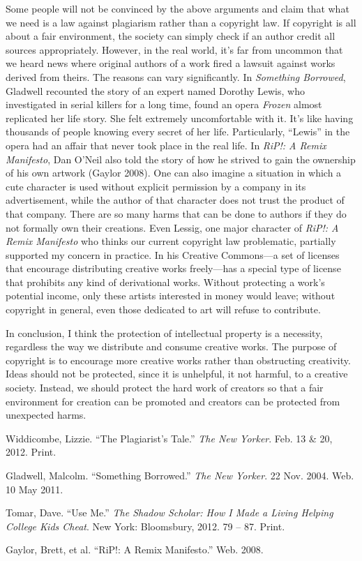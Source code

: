 \documentclass{writing}
\begin{document}
Some people will not be convinced by the above arguments and claim that
what we need is a law against plagiarism rather than a copyright law. If
copyright is all about a fair environment, the society can simply check
if an author credit all sources appropriately. However, in the real
world, it's far from uncommon that we heard news where original authors
of a work fired a lawsuit against works derived from theirs. The reasons
can vary significantly. In \emph{Something Borrowed}, Gladwell recounted
the story of an expert named Dorothy Lewis, who investigated in serial
killers for a long time, found an opera \emph{Frozen} almost replicated
her life story. She felt extremely uncomfortable with it. It's like
having thousands of people knowing every secret of her life.
Particularly, ``Lewis'' in the opera had an affair that never took place
in the real life. In \emph{RiP!: A Remix Manifesto}, Dan O'Neil also
told the story of how he strived to gain the ownership of his own
artwork (Gaylor 2008). One can also imagine a situation in which a cute
character is used without explicit permission by a company in its
advertisement, while the author of that character does not trust the
product of that company. There are so many harms that can be done to
authors if they do not formally own their creations. Even Lessig, one
major character of \emph{RiP!: A Remix Manifesto} who thinks our current
copyright law problematic, partially supported my concern in practice.
In his Creative Commons---a set of licenses that encourage distributing
creative works freely---has a special type of license that prohibits any
kind of derivational works. Without protecting a work's potential
income, only these artists interested in money would leave; without
copyright in general, even those dedicated to art will refuse to
contribute.

In conclusion, I think the protection of intellectual property is a
necessity, regardless the way we distribute and consume creative works.
The purpose of copyright is to encourage more creative works rather than
obstructing creativity. Ideas should not be protected, since it is
unhelpful, it not harmful, to a creative society. Instead, we should
protect the hard work of creators so that a fair environment for
creation can be promoted and creators can be protected from unexpected
harms.

\begin{references}
\item
  Widdicombe, Lizzie. ``The Plagiarist's Tale.'' \emph{The New Yorker}.
  Feb. 13 \& 20, 2012. Print.
\item
  Gladwell, Malcolm. ``Something Borrowed.'' \emph{The New Yorker}. 22
  Nov. 2004. Web. 10 May 2011.
\item
  Tomar, Dave. ``Use Me.'' \emph{The Shadow Scholar: How I Made a Living
  Helping College Kids Cheat}. New York: Bloomsbury, 2012. 79 -- 87.
  Print.
\item
  Gaylor, Brett, et al. ``RiP!: A Remix Manifesto.'' Web. 2008.
\end{references}
\end{document}
